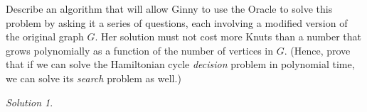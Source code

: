 \documentclass[12pt]{article}
\theoremstyle{remark}
\newtheorem*{solution}{Solution}
\begin{document}
\begin{enumerate}
\begin{enumerate}
	Describe an algorithm that will allow Ginny to use the Oracle to solve this problem by asking it a series of questions, each involving a modified version of the original graph $G$. Her solution must not cost more Knuts than a number that grows polynomially as a function of the number of vertices in $G$. (Hence, prove that if we can solve the Hamiltonian cycle \textit{decision} problem in polynomial time, we can solve its \textit{search} problem as well.)\\
		\begin{solution}
    
    \end{solution}
	
	\end{enumerate}
    
\end{enumerate}
\end{document}
